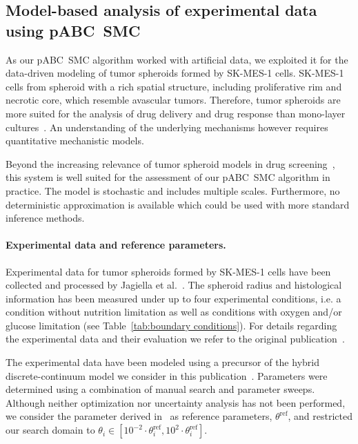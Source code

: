 \documentclass[10pt,letterpaper]{article}
\begin{document}
\subsection*{Model-based analysis of experimental data using pABC~SMC}
As our pABC~SMC algorithm worked with artificial data, we exploited it for the data-driven modeling of tumor spheroids formed by SK-MES-1 cells. SK-MES-1 cells from spheroid with a rich spatial structure, including proliferative rim and necrotic core, which resemble avascular tumors. Therefore, tumor spheroids are more suited for the analysis of drug delivery and drug response than mono-layer cultures~\cite{CarverMin2014,LemmoAte2014}. An understanding of the underlying mechanisms however requires quantitative mechanistic models. 

Beyond the increasing relevance of tumor spheroid models in drug screening~\cite{KwapiszewskaMic2014}, this system is well suited for the assessment of our pABC~SMC algorithm in practice. The model is stochastic and includes multiple scales. Furthermore, no deterministic approximation is available which could be used with more standard inference methods.

\paragraph*{Experimental data and reference parameters.}
Experimental data for tumor spheroids formed by SK-MES-1 cells have been collected and processed by Jagiella et al.~\cite{JagiellaMul2015}. The spheroid radius and histological information has been measured under up to four experimental conditions, i.e. a condition without nutrition limitation as well as conditions with oxygen and/or glucose limitation  (see Table~\ref{tab:boundary conditions}). For details regarding the experimental data and their evaluation we refer to the original publication~\cite{JagiellaMul2015}.

The experimental data have been modeled using a precursor of the hybrid discrete-continuum model we consider in this publication~\cite{JagiellaMul2015}. Parameters were determined using a combination of manual search and parameter sweeps. Although neither optimization nor uncertainty analysis has not been performed, we consider the parameter derived in~\cite{JagiellaMul2015} as reference parameters, $\theta^{\text{ref}}$, and restricted our search domain to $\theta_i \in [10^{-2} \cdot \theta_i^{\text{ref}},10^{2} \cdot\theta_i^{\text{ref}}]$.
\end{document}
